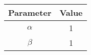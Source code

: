 \begin{tabular}{c|c}
    \hline
    Parameter & Value \\ \hline
    $\alpha$  & 1     \\ \hline
    $\beta$   & 1     \\ \hline
\end{tabular}
